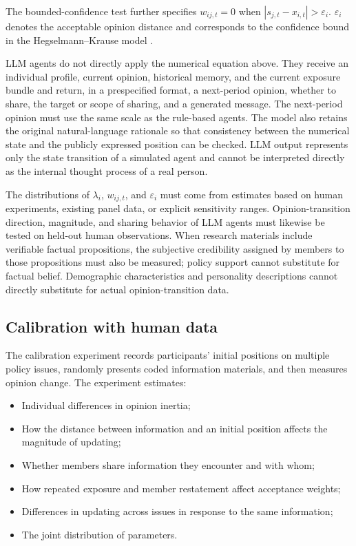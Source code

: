 \documentclass[11pt,a4paper]{article}
\begin{document}
The bounded-confidence test further specifies $w_{ij,t}=0$ when $|s_{j,t}-x_{i,t}|>\varepsilon_i$. $\varepsilon_i$ denotes the acceptable opinion distance and corresponds to the confidence bound in the Hegselmann--Krause model \cite{hegselmann2002}.

LLM agents do not directly apply the numerical equation above. They receive an individual profile, current opinion, historical memory, and the current exposure bundle and return, in a prespecified format, a next-period opinion, whether to share, the target or scope of sharing, and a generated message. The next-period opinion must use the same scale as the rule-based agents. The model also retains the original natural-language rationale so that consistency between the numerical state and the publicly expressed position can be checked. LLM output represents only the state transition of a simulated agent and cannot be interpreted directly as the internal thought process of a real person.

The distributions of $\lambda_i$, $w_{ij,t}$, and $\varepsilon_i$ must come from estimates based on human experiments, existing panel data, or explicit sensitivity ranges. Opinion-transition direction, magnitude, and sharing behavior of LLM agents must likewise be tested on held-out human observations. When research materials include verifiable factual propositions, the subjective credibility assigned by members to those propositions must also be measured; policy support cannot substitute for factual belief. Demographic characteristics and personality descriptions cannot directly substitute for actual opinion-transition data.

\subsection{Calibration with human data}

The calibration experiment records participants' initial positions on multiple policy issues, randomly presents coded information materials, and then measures opinion change. The experiment estimates:

\begin{itemize}
\item Individual differences in opinion inertia;
\item How the distance between information and an initial position affects the magnitude of updating;
\item Whether members share information they encounter and with whom;
\item How repeated exposure and member restatement affect acceptance weights;
\item Differences in updating across issues in response to the same information;
\item The joint distribution of parameters.
\end{itemize}
\end{document}
